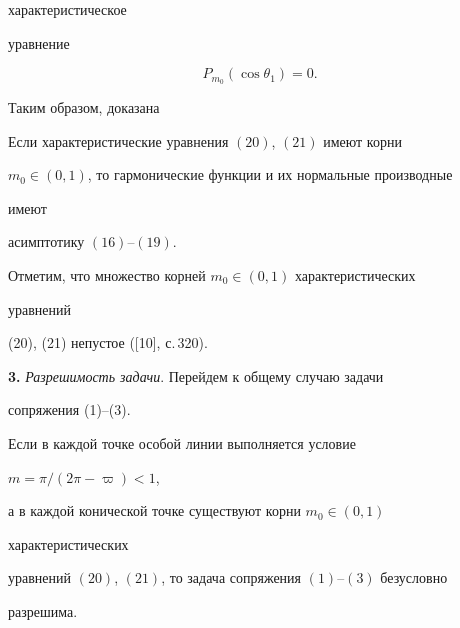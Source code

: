 характеристическое  


уравнение 


\begin{equation} 


P_{m_0}(\cos\theta_1)=0. 


\end{equation} 


Таким образом, доказана  


 


\begin{lem} 


Если характеристические уравнения $(20)$, $(21)$ имеют корни 


$m_0\in(0,1)$, то гармонические функции и их нормальные производные 


имеют  


асимптотику $(16)$--$(19)$. 


\end{lem} 


 


Отметим, что множество корней $m_0\in(0,1)$ характеристических 


уравнений  


(20), (21) непустое ([10], с.\,320).  


\medskip 


 


{\bf 3.} {\it Разрешимость задачи}. Перейдем к общему случаю задачи 


сопряжения (1)--(3). 


 


\begin{thmnonum} 


Если в каждой точке особой линии выполняется условие 


$m=\pi/(2\pi-\varpi)<1$, 


а в каждой конической точке существуют корни $m_0\in(0,1)$ 


характеристических  


уравнений $(20)$, $(21)$, то задача сопряжения $(1)$--$(3)$ безусловно 


разрешима.  


\end{thmnonum} 


 


